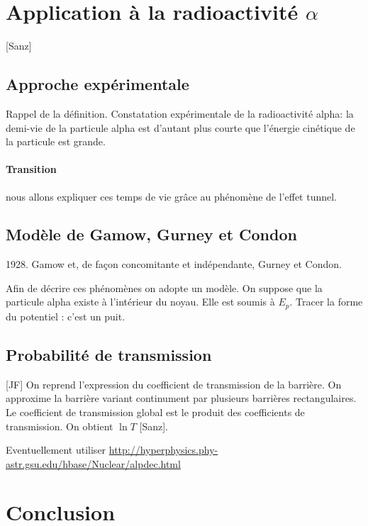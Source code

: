 \documentclass[11pt]{report}
\numberwithin{figure}{section}
\numberwithin{equation}{section}
\numberwithin{table}{section}
\newcommand{\1}{\boldsymbol{1}}
\begin{document}
\section{Application à la radioactivité $\alpha$}

[Sanz]

\subsection{Approche expérimentale}

Rappel de la définition. Constatation expérimentale de la radioactivité alpha: la demi-vie de la particule alpha est d’autant plus courte que l’énergie cinétique de la particule est grande. 

\paragraph{Transition} nous allons expliquer ces temps de vie grâce au phénomène de l’effet tunnel.

\subsection{Modèle de Gamow, Gurney et Condon}

1928. Gamow et, de façon concomitante et indépendante, Gurney et Condon.

Afin de décrire ces phénomènes on adopte un modèle. On suppose que la particule alpha existe à l’intérieur du noyau. Elle est soumis à $E_p$. Tracer la forme du potentiel : c'est un puit. 

\subsection{Probabilité de transmission}

[JF] On reprend l’expression du coefficient de transmission de la barrière. On approxime la barrière variant continument par plusieurs barrières rectangulaires. Le coefficient de transmission global
est le produit des coefficients de transmission. On obtient $\ln T$ [Sanz].

Eventuellement utiliser \url{http://hyperphysics.phy-astr.gsu.edu/hbase/Nuclear/alpdec.html}
  
\section*{Conclusion}
\end{document}
